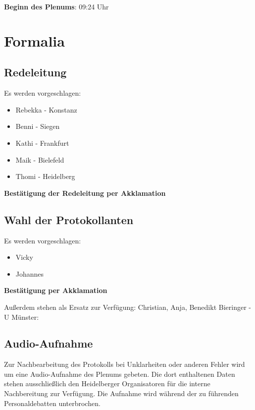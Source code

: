 
\label{chap:ende}
\textbf{Beginn des Plenums}: 09:24 Uhr

\section{Formalia}
  \subsection*{Redeleitung}
    Es werden vorgeschlagen:
    \begin{itemize}
      \item Rebekka - Konstanz
      \item Benni - Siegen
      \item Kathi - Frankfurt
      \item Maik - Bielefeld
      \item Thomi - Heidelberg
    \end{itemize}

    \begin{success}{}
      \begin{center}
        \textbf{Bestätigung der Redeleitung per Akklamation}
      \end{center}
    \end{success}

  \subsection*{Wahl der Protokollanten}
    Es werden vorgeschlagen:
    \begin{itemize}
      \item Vicky
      \item Johannes
    \end{itemize}

    \begin{success}{}
      \begin{center}
        \textbf{Bestätigung per Akklamation}
      \end{center}
    \end{success}
    Außerdem stehen als Ersatz zur Verfügung: Christian, Anja, Benedikt Bieringer - U Münster:

  \subsection*{Audio-Aufnahme}
    Zur Nachbearbeitung des Protokolls bei Unklarheiten oder anderen Fehler wird um eine Audio-Aufnahme des Plenums gebeten.
    Die dort enthaltenen Daten stehen ausschließlich den Heidelberger Organisatoren für die interne Nachbereitung zur Verfügung. Die Aufnahme wird während der zu führenden Personaldebatten unterbrochen.

